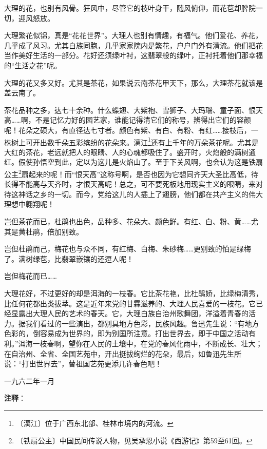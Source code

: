 \documentclass[12pt,UTF-8,openany]{ctexbook}
\begin{document}
\begin{large}
    大理的花，也别有风骨。狂风中，尽管它的枝叶身干，随风俯仰，而花苞却脾院一切，迎风怒放。
    
    大理繁花似锦，真是“花花世界”。大理人也别有情趣，有福气。他们爱花、养花，几乎成了风习。尤其白族同胞，几乎家家院内是繁花，户户门外有清流。他们把花当作美好生活的一部分。花好还须绿叶衬，这翡翠般的绿叶，正衬托着他们那幸福的“生活之花”呢。
    
    大理的花又多又好。尤其是茶花，如果说云南茶花甲天下，那么，大理茶花就该是盖云南了。
    
    茶花品种之多，达七十余种。什么蝶翅、大紫袍、雪狮子、大玛瑙、童子面、恨天高……啊，不是记忆力好的园艺家，谁能记得清它们的称号，辨得出它们的容颜呢！花朵之硕大，有直径达七寸者。颜色有紫、有白、有粉、有红……接枝后，一株树上可开出数千朵五彩缤纷的花朵来。漓江\footnote{〔漓江〕位于广西东北部、桂林市境内的河流。}还有上千年的万朵茶花呢。尤其是大红的茶花，老远就把人的眼睛、人的心魂都吸住了。盛开时，火焰般的满树通红。假使孙悟空到此，定以为这儿是火焰山了。至于下关风啊，也会认为这是铁扇公主\footnote{〔铁扇公主〕中国民间传说人物，见吴承恩小说《西游记》第59至61回。}扇起来的呢！而“恨天高”这称号啊，是否也因为它想同齐天大圣比高低，待长得不能高与天齐时，才恨天高呢！总之，可不要死板地用现实主义的眼睛，来对待这神话之乡的一切。而今，党给这儿的人插上了翅膀，他们都在共产主义的伟大理想中翱翔呢！
    
    岂但茶花而已，杜鹃也出色，品种多、花朵大、颜色鲜。有红、白、粉、黄……尤其是黄杜鹃，倍加别致。
    
    岂但杜鹃而己，梅花也与众不同，有红梅、白梅、朱砂梅……更别致的怕是绿梅了。满树绿苞，比翡翠嵌镶的还逗人呢！
    
    岂但梅花而已……
    
    大理花好，不过更好的却是洱海的一枝春。它比茶花艳，比杜鹃娇，比绿梅清秀，比任何花都出类拔萃。这是近年来党的甘霖滋养的、大理人民喜爱的一枝花。它已经显露出大理人民的艺术的春天。它，大理白族自治州歌舞团，洋溢着青春的活力。据我们看过的一些演出，都别具地方色彩，民族风趣。鲁迅先生说：“有地方色彩的，倒容易成为世界的，即为别国所注意。打出世界去，即于中国之活动有利。”洱海一枝春啊，望你在人民的土壤中，在党的春风化雨中，不断成长、壮大；在自治州、全省、全国艺苑中，开出挺拔绚烂的花朵，最后，如鲁迅先生所说：“打出世界去”，替祖国艺苑更添几许春色吧！
    
    \hfill 一九六二年一月
    
\end{large}


\newpage

\textbf{注释}：

\vspace{-1em}
\end{document}

